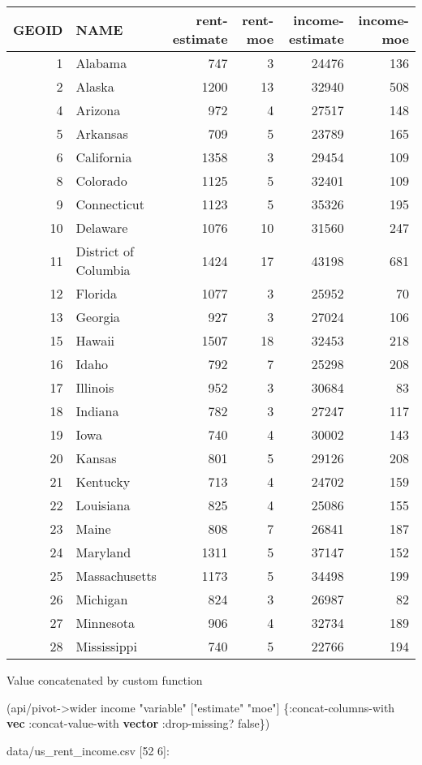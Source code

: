 \documentclass[]{article}
\newenvironment{Shaded}{\begin{snugshade}}{\end{snugshade}}
\newcommand{\KeywordTok}[1]{\textcolor[rgb]{0.13,0.29,0.53}{\textbf{#1}}}
\newcommand{\StringTok}[1]{\textcolor[rgb]{0.31,0.60,0.02}{#1}}
\newcommand{\VariableTok}[1]{\textcolor[rgb]{0.00,0.00,0.00}{#1}}
\newcommand{\AttributeTok}[1]{\textcolor[rgb]{0.77,0.63,0.00}{#1}}
\newcommand{\NormalTok}[1]{#1}
\begin{document}
\begin{longtable}[]{@{}rlrrrr@{}}
\toprule
GEOID & NAME & rent-estimate & rent-moe & income-estimate &
income-moe\tabularnewline
\midrule
\endhead
1 & Alabama & 747 & 3 & 24476 & 136\tabularnewline
2 & Alaska & 1200 & 13 & 32940 & 508\tabularnewline
4 & Arizona & 972 & 4 & 27517 & 148\tabularnewline
5 & Arkansas & 709 & 5 & 23789 & 165\tabularnewline
6 & California & 1358 & 3 & 29454 & 109\tabularnewline
8 & Colorado & 1125 & 5 & 32401 & 109\tabularnewline
9 & Connecticut & 1123 & 5 & 35326 & 195\tabularnewline
10 & Delaware & 1076 & 10 & 31560 & 247\tabularnewline
11 & District of Columbia & 1424 & 17 & 43198 & 681\tabularnewline
12 & Florida & 1077 & 3 & 25952 & 70\tabularnewline
13 & Georgia & 927 & 3 & 27024 & 106\tabularnewline
15 & Hawaii & 1507 & 18 & 32453 & 218\tabularnewline
16 & Idaho & 792 & 7 & 25298 & 208\tabularnewline
17 & Illinois & 952 & 3 & 30684 & 83\tabularnewline
18 & Indiana & 782 & 3 & 27247 & 117\tabularnewline
19 & Iowa & 740 & 4 & 30002 & 143\tabularnewline
20 & Kansas & 801 & 5 & 29126 & 208\tabularnewline
21 & Kentucky & 713 & 4 & 24702 & 159\tabularnewline
22 & Louisiana & 825 & 4 & 25086 & 155\tabularnewline
23 & Maine & 808 & 7 & 26841 & 187\tabularnewline
24 & Maryland & 1311 & 5 & 37147 & 152\tabularnewline
25 & Massachusetts & 1173 & 5 & 34498 & 199\tabularnewline
26 & Michigan & 824 & 3 & 26987 & 82\tabularnewline
27 & Minnesota & 906 & 4 & 32734 & 189\tabularnewline
28 & Mississippi & 740 & 5 & 22766 & 194\tabularnewline
\bottomrule
\end{longtable}

Value concatenated by custom function

\begin{Shaded}
\begin{Highlighting}[]
\NormalTok{(api/pivot->wider income }\StringTok{"variable"}\NormalTok{ [}\StringTok{"estimate"} \StringTok{"moe"}\NormalTok{] \{}\AttributeTok{:concat-columns-with} \KeywordTok{vec}
                                                        \AttributeTok{:concat-value-with} \KeywordTok{vector}
                                                        \AttributeTok{:drop-missing}\NormalTok{? }\VariableTok{false}\NormalTok{\})}
\end{Highlighting}
\end{Shaded}

data/us\_rent\_income.csv {[}52 6{]}:
\end{document}
